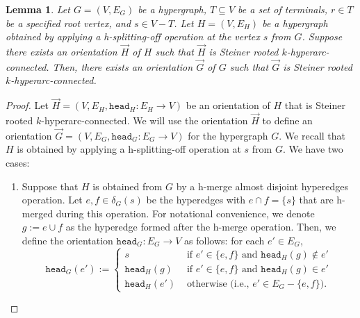 \documentclass{article}
\newtheorem{lemma}{Lemma}[section]
\newcommand{\knote}[1]{{\color{red}[{\tiny Karthik: \bf #1}]\marginpar{\color{red}*}}}
\newcommand{\head}{\ensuremath{\texttt{head}}\xspace}
\begin{document}
\begin{lemma}\label{lem:lifting-Steiner-orientation-through-splitting-off}
    Let $G=(V, E_G)$ be a hypergraph, $T\subseteq V$ be a set of terminals, $r\in T$ be a specified root vertex, and $s\in V-T$. 
    Let $H = (V, E_H)$ be a hypergraph obtained by applying a h-splitting-off operation at the vertex $s$ from $G$. 
    Suppose there exists an orientation $\overrightarrow{H}$  
    of $H$ such that $\overrightarrow{H}$ is Steiner rooted $k$-hyperarc-connected. 
    Then, there exists an orientation 
    $\overrightarrow{G}$ 
    of $G$ such that $\overrightarrow{G}$ is Steiner rooted $k$-hyperarc-connected. 
\end{lemma}
\begin{proof}
 Let $\overrightarrow{H}= (V, E_H, \head_H:E_H\rightarrow V)$ be an orientation of $H$ that is Steiner rooted $k$-hyperarc-connected.  
  We will use the orientation $\overrightarrow{H}$ to define an orientation $\overrightarrow{G}=(V, E_G, \head_G: E_G\rightarrow V)$ for the hypergraph $G$. 
  We recall that $H$ is obtained by applying a h-splitting-off operation at $s$ from $G$. We have two cases: 
\begin{enumerate}
    \item Suppose that $H$ is obtained 
    from $G$ by a h-merge almost disjoint hyperedges operation. Let $e, f \in \delta_{G}(s)$ be the hyperedges with $e\cap f = \{s\}$ that are h-merged during this operation. For notational convenience, we denote $g:= e\cup f$ as the hyperedge formed after the h-merge operation. Then, we define the orientation $\head_{G}:E_G\rightarrow V$ as follows: for each $e' \in E_G$,
$$\head_{G}(e') := \begin{cases}
    s& \text{ if } e' \in \{e, f\} \text{ and } \head_{H}(g) \not \in e'\\
    
    \head_{H}(g) &\text{ if } e' \in \{e, f\} \text{ and } \head_{H}(g) \in e'\\
    
    \head_{H}(e')& \text{ otherwise (i.e., $e'\in E_G-\{e, f\}$).}
\end{cases}$$


\end{enumerate}
\end{proof}
\end{document}

